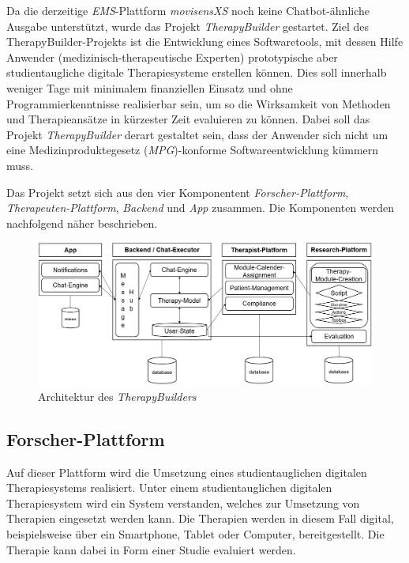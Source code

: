Da die derzeitige \emph{EMS}-Plattform \emph{movisensXS} noch keine Chatbot-ähnliche Ausgabe unterstützt, wurde das Projekt \emph{TherapyBuilder} gestartet. Ziel des TherapyBuilder-Projekts ist die Entwicklung eines Softwaretools, mit dessen Hilfe Anwender (medizinisch-therapeutische Experten) prototypische aber studientaugliche digitale Therapiesysteme erstellen können. Dies soll innerhalb weniger Tage mit minimalem finanziellen Einsatz und ohne Programmierkenntnisse realisierbar sein, um so die Wirksamkeit von Methoden und Therapieansätze in kürzester Zeit evaluieren zu können. Dabei soll das Projekt \emph{TherapyBuilder} derart gestaltet sein, dass der Anwender sich nicht um eine Medizinproduktegesetz (\emph{MPG})-konforme Softwareentwicklung kümmern muss. 

Das Projekt setzt sich aus den vier Komponentent \emph{Forscher-Plattform}, \emph{Therapeuten-Plattform}, \emph{Backend} und \emph{App} zusammen. Die Komponenten werden nachfolgend näher beschrieben.

\begin{figure}[h]
\centering
\includegraphics[width=1\textwidth]{pictures/TherapyBuilder}
\caption{Architektur des \emph{TherapyBuilders}}
\label{therapyBuilder}
\end{figure}


\subsection{Forscher-Plattform}

Auf dieser Plattform wird die Umsetzung eines studientauglichen digitalen Therapiesystems realisiert. Unter einem studientauglichen digitalen Therapiesystem wird ein System verstanden, welches zur Umsetzung von Therapien eingesetzt werden kann. Die Therapien werden in diesem Fall digital, beispielsweise über ein Smartphone, Tablet oder Computer, bereitgestellt. Die Therapie kann dabei in Form einer Studie evaluiert werden.

